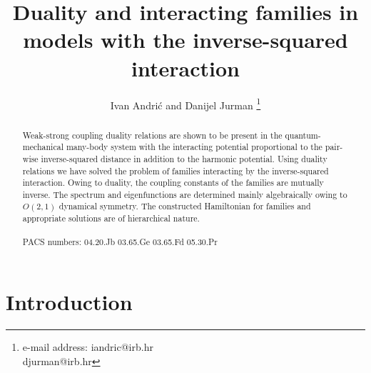 \documentclass[a4paper,preprint,aps]{revtex4}
\begin{document}
\title{Duality and interacting families in models with the inverse-squared
 interaction}
\author{Ivan Andri\' c and Danijel Jurman
\footnote{e-mail address: 
iandric@irb.hr \\ \hspace*{2.2cm}
djurman@irb.hr }}












\begin{abstract}

 Weak-strong coupling duality relations are shown to be present in the 
quantum-mechanical many-body system with the interacting potential 
proportional to the pair-wise inverse-squared distance in addition to the
 harmonic potential. Using duality relations we have solved the problem of
 families interacting by the inverse-squared interaction. Owing to duality,
  the coupling constants of the families are mutually inverse. The spectrum
 and eigenfunctions are determined mainly algebraically owing to $O(2,1)$
 dynamical symmetry. The constructed Hamiltonian for families and appropriate
 solutions are of hierarchical nature.\\
\\ 
PACS numbers: 04.20.Jb  03.65.Ge  03.65.Fd 05.30.Pr 
\end{abstract}



\maketitle

\section{Introduction}
\end{document}
